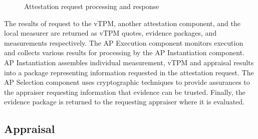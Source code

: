 \documentclass[10pt]{article}
\begin{document}
\begin{figure}
\centering 
{}
  \caption{Attestation request processing and response}
  \label{fig:attestation}
\end{figure}

The results of request to the vTPM, another attestation component, and
the local measurer are returned as vTPM quotes, evidence packages, and
measurements respectively.  The AP Execution component monitors
execution and collects various results for processing by the AP
Instantiation component.  AP Instantiation assembles individual
measurement, vTPM and appraisal results into a package representing
information requested in the attestation request.  The AP Selection
component uses cryptographic techniques to provide assurances to the
appraiser requesting information that evidence can be trusted.
Finally, the evidence package is returned to the requesting appraiser
where it is evaluated.

\subsection{Appraisal}
\end{document}
